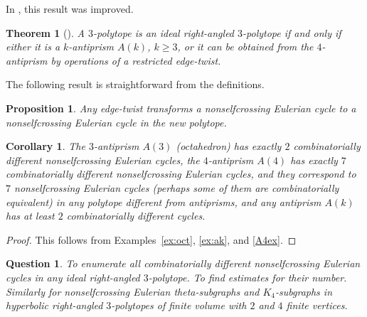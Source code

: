 \documentclass[12pt]{amsart}
\newtheorem{proposition}[formula]{Proposition}
\newtheorem{corollary}[formula]{Corollary}
\newtheorem{theorem}[formula]{Theorem}
\newtheorem{question}{Question}
\theoremstyle{definition}
\theoremstyle{remark}
\newtheorem{remark}[formula]{Remark}
\begin{document}
In \cite[Theorem 9.13]{E19}, this result was improved. 

\begin{theorem}[\cite{E19}]\label{I-th}
A $3$-polytope is an ideal right-angled $3$-polytope if and only if either it is a $k$-antiprism $A(k)$, $k\geqslant 3$, or it can be 
obtained from the $4$-antiprism by operations of a restricted edge-twist.
\end{theorem}

The following result is straightforward from the definitions.
\begin{proposition}
Any edge-twist transforms a nonselfcrossing Eulerian cycle to a nonselfcrossing Eulerian cycle in the new polytope. 
\end{proposition}
\begin{corollary}
The $3$-antiprism $A(3)$ (octahedron)  has exactly $2$ combinatorially different nonselfcrossing Eulerian cycles, 
the $4$-antiprism $A(4)$  has exactly $7$ combinatorially different nonselfcrossing Eulerian cycles, 
and they correspond to $7$ nonselfcrossing Eulerian cycles (perhaps some of them are combinatorially equivalent) 
in any polytope different from antiprisms,  and any antiprism $A(k)$ has at least $2$ combinatorially different cycles.
\end{corollary}
\begin{proof}
This follows from Examples~\ref{ex:oct}, \ref{ex:ak}, and \ref{A4ex}.
\end{proof}

\begin{question}
To enumerate all combinatorially different nonselfcrossing Eulerian cycles in any ideal right-angled $3$-polytope. To find estimates for their number. Similarly for nonselfcrossing Eulerian theta-subgraphs and $K_4$-subgraphs in hyperbolic right-angled $3$-polytopes of finite volume with $2$ and $4$ finite vertices.
\end{question}
\end{document}
